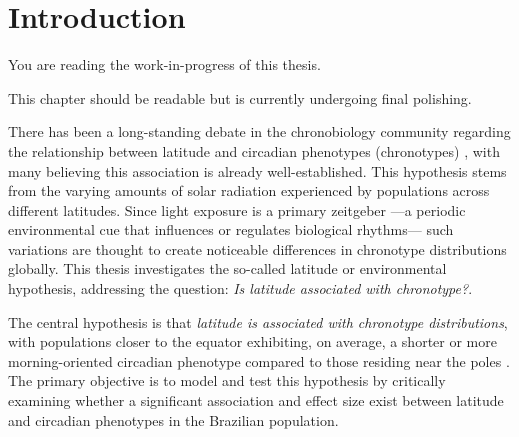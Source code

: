 \documentclass[
12pt,
openright,
oneside,
a4paper,
chapter=TITLE,
section=TITLE,
french,
spanish,
brazil,
english
]{abntex2}\usepackage{array}
\newcommand{\microskip}{\vspace{\microskipamount}}
\renewcommand{\contentsname}{Contents}
\renewcommand{\contentsname}{Sumário}
\renewcommand{\contentsname}{Sumario}
\renewcommand{\contentsname}{Sommaire}
\renewcommand{\textual}{
  \pagestyle{abntheadings}
  \aliaspagestyle{chapter}{abntheadings}
}
\renewcommand*\contentsname{Table of contents}
\newcommand\contentsname{Table of contents}
\begin{document}

\pdfbookmark[0]{\contentsname}{toc}
\tableofcontents*
\cleardoublepage


\textual
{}

\chapter{Introduction}\label{introduction}

\begin{tcolorbox}[enhanced jigsaw, opacitybacktitle=0.6, titlerule=0mm, coltitle=black, bottomtitle=1mm, breakable, rightrule=.15mm, left=2mm, title=\textcolor{quarto-callout-note-color}{\faInfo}\hspace{0.5em}{Note}, opacityback=0, colbacktitle=quarto-callout-note-color!10!white, toprule=.15mm, toptitle=1mm, leftrule=.75mm, colback=white, bottomrule=.15mm, arc=.35mm, colframe=quarto-callout-note-color-frame]

You are reading the work-in-progress of this thesis.

\microskip

This chapter should be readable but is currently undergoing final
polishing.

\end{tcolorbox}

There has been a long-standing debate in the chronobiology community
regarding the relationship between latitude and circadian phenotypes
(chronotypes)
\autocite{randler2008,leocadio-miguel2017,zerbini2021,skeldon2021}, with
many believing this association is already well-established. This
hypothesis stems from the varying amounts of solar radiation experienced
by populations across different latitudes. Since light exposure is a
primary zeitgeber ---a periodic environmental cue that influences or
regulates biological rhythms--- such variations are thought to create
noticeable differences in chronotype distributions globally. This thesis
investigates the so-called latitude or environmental hypothesis,
addressing the question: \emph{Is latitude associated with chronotype?}.

The central hypothesis is that \emph{latitude is associated with
chronotype distributions}, with populations closer to the equator
exhibiting, on average, a shorter or more morning-oriented circadian
phenotype compared to those residing near the poles
\autocite{hut2013,leocadio-miguel2014,leocadio-miguel2017,pittendrigh1991,randler2008,randler2017,roenneberg2003}.
The primary objective is to model and test this hypothesis by critically
examining whether a significant association and effect size exist
between latitude and circadian phenotypes in the Brazilian population.
\end{document}
